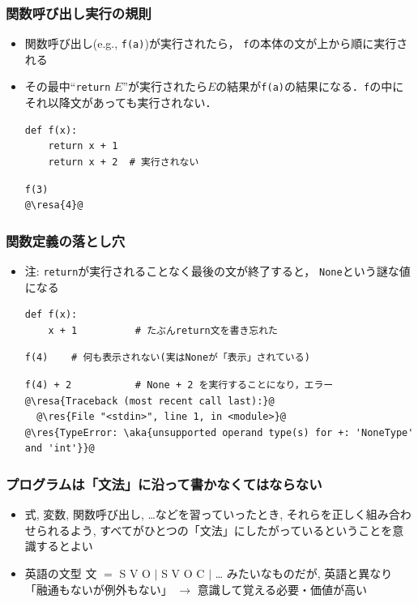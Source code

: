 \documentclass[10pt,dvipdfmx]{beamer}
\newcommand{\ore}[1]{{\color{orange}#1}}
\newcommand{\ao}[1]{{\color{blue}#1}}
\newcommand{\aka}[1]{{\color{red}#1}}
\newcommand{\resa}[1]{\ore{\textsl{$\rightarrow$ #1}}}
\newcommand{\res}[1]{\ore{\textsl{#1}}}
\begin{document}
\begin{frame}[fragile]
\frametitle{関数呼び出し実行の規則}
\begin{itemize}
\item 関数呼び出し(e.g., {\tt f(a)})が実行されたら，
  {\tt f}の本体の文が上から順に実行される
\item その最中``{\tt return} $E$''が実行されたら$E$の結果が{\tt f(a)}の結果になる．{\tt f}の中にそれ以降文があっても実行されない．
\begin{lstlisting}
def f(x):
    return x + 1
    return x + 2  # 実行されない
\end{lstlisting}
\begin{lstlisting}
f(3)
@\resa{4}@
\end{lstlisting}
\end{itemize}
\end{frame}

\begin{frame}[fragile]
\frametitle{関数定義の落とし穴}
\begin{itemize}
\item \aka{注:} {\tt return}が実行されることなく最後の文が終了すると，
\ao{\tt None}という謎な値になる
\begin{lstlisting}
def f(x):
    x + 1          # たぶんreturn文を書き忘れた
\end{lstlisting}
\begin{lstlisting}
f(4)    # 何も表示されない(実はNoneが「表示」されている)
\end{lstlisting}
\begin{lstlisting}
f(4) + 2           # None + 2 を実行することになり，エラー
@\resa{Traceback (most recent call last):}@
  @\res{File "<stdin>", line 1, in <module>}@
@\res{TypeError: \aka{unsupported operand type(s) for +: 'NoneType' and 'int'}}@
\end{lstlisting}
\end{itemize}
\end{frame}

\begin{frame}
  \frametitle{プログラムは「文法」に沿って書かなくてはならない}
  \begin{itemize}
  \item 式, 変数, 関数呼び出し, \ldots などを習っていったとき,
    それらを正しく組み合わせられるよう,
    すべてがひとつの「文法」にしたがっているということを意識するとよい
  \item 英語の文型 文 $=$ S V O $|$ S V O C $|$ \ldots
    みたいなものだが, 英語と異なり\aka{「融通もないが例外もない」}
    $\rightarrow$ 意識して覚える必要・価値が高い
  \end{itemize}
\end{frame}
\end{document}

